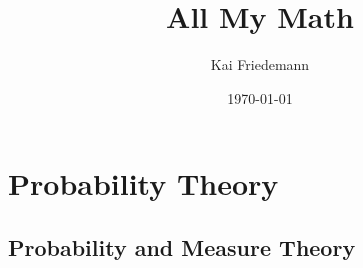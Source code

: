 \documentclass[12pt]{book}
\title{All My Math}
\author{Kai Friedemann}
\date{\today}
\begin{document}
\maketitle
\tableofcontents
\cite{Devaney1989}
\part{Probability Theory}
\chapter{Probability and Measure Theory}



  
\end{document}
